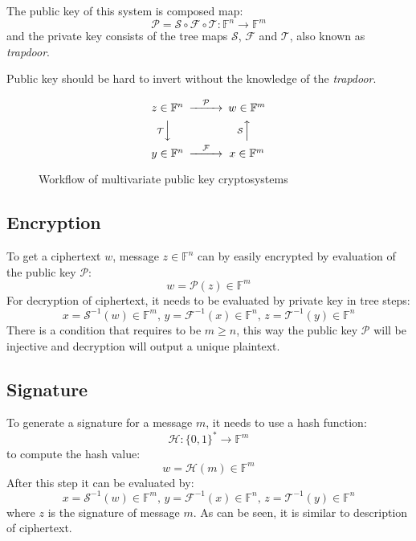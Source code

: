 \documentclass[thesis=M,english]{FITthesis}[2019/12/23]
\begin{document}
The public key of this system is composed map:
\[
	\mathcal{P} = \mathcal{S} \circ \mathcal{F} \circ \mathcal{T} : \mathbb{F}^n \rightarrow \mathbb{F}^m
\]
and the private key consists of the tree maps $\mathcal{S}$, $\mathcal{F}$ and $\mathcal{T}$, also known as \textit{trapdoor}.

Public key should be hard to invert without the knowledge of the \textit{trapdoor}.

\begin{figure}[h]
\begin{equation*}
  \begin{CD}
     z \in \mathbb{F}^n @>  \mathcal{P} >> w \in \mathbb{F}^m \\
    @V\mathcal{T}VV  @A\mathcal{S}AA \\
  y \in \mathbb{F}^n @> \mathcal{F} >> x \in \mathbb{F}^m
  \end{CD}
\end{equation*}
\caption{Workflow of multivariate public key cryptosystems}
\end{figure}
\smallskip

\subsection{Encryption}
To get a ciphertext $w$, message $z \in \mathbb{F}^n$ can by easily encrypted by evaluation of the public key $\mathcal{P}$:
\[
	w = \mathcal{P}(z) \in \mathbb{F}^m
\]
For decryption of ciphertext, it needs to be evaluated by private key in tree steps: 
\[
	x = \mathcal{S}^{-1}(w) \in \mathbb{F}^m, \, y = \mathcal{F}^{-1}(x) \in \mathbb{F}^n, \, z = \mathcal{T}^{-1}(y) \in \mathbb{F}^n
\]
There is a condition that requires to be $m \geq n$, this way the public key $\mathcal{P}$ will be injective and decryption will output a unique plaintext.

\subsection{Signature}
To generate a signature for a message $m$, it needs to use a hash function:
\[
	\mathcal{H}: \{0,1\}^{*} \rightarrow \mathbb{F}^m
\]
to compute the hash value:
\[
	w = \mathcal{H}(m) \in \mathbb{F}^m
\]
After this step it can be evaluated by:
\[
	x = \mathcal{S}^{-1}(w) \in \mathbb{F}^m, \, y = \mathcal{F}^{-1}(x) \in \mathbb{F}^n, \, z = \mathcal{T}^{-1}(y) \in \mathbb{F}^n
\]
where $z$ is the signature of message $m$. As can be seen, it is similar to description of ciphertext.
\end{document}

